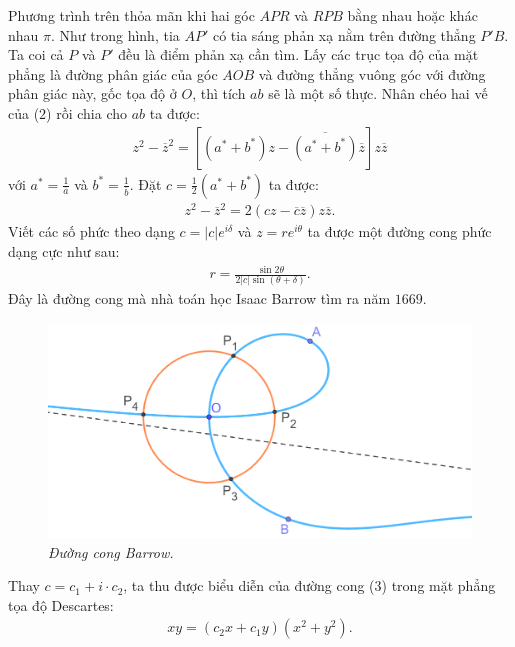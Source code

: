 \begin{multicols}{2}
	\vskip 0.1cm
	Phương trình trên thỏa mãn khi hai góc $APR$ và $RPB$ bằng nhau hoặc khác nhau $\pi$. Như trong hình, tia $AP'$ có tia sáng phản xạ nằm trên đường thẳng $P'B$. Ta coi cả $P$ và $P'$ đều là điểm phản xạ cần tìm.
	\vskip 0.1cm
	Lấy các trục tọa độ của mặt phẳng là đường phân giác của góc $AOB$ và đường thẳng vuông góc với đường phân giác này, gốc tọa độ ở $O$, thì tích $ab$ sẽ là một số thực. Nhân chéo hai vế của ($2$) rồi chia cho $ab$ ta được:
	\begin{align*}
		z^2 - \overline{z}^2 = \left[(a^*+ b^*)z - \overline{(a^*+b^*)}\overline{z}\right]z\overline{z}
	\end{align*}
	với $a^*=\frac{1}{\overline{a}}$ và  $b^*=\frac{1}{\overline{b}}$. Đặt $c = \frac{1}{2}(a^*+ b^*)$ ta được:
	\begin{align*}
		z^2 - \overline{z}^2 = 2 (cz - \overline{c}\overline{z})z\overline{z}.
	\end{align*}
	Viết các số phức theo dạng $c = |c|e^{i\delta}$ và $z=re^{i\theta}$ ta được một đường cong phức dạng cực như sau:
	\begin{align*}
		r = \frac{\sin2\theta}{2|c|\sin(\theta + \delta)}. \tag{$3$}
	\end{align*}
	Đây là đường cong mà nhà toán học Isaac Barrow tìm ra năm $1669$.
	\begin{figure}[H]
		\vspace*{-5pt}
		\centering
		\captionsetup{labelformat= empty, justification=centering}
		\includegraphics[width= 1\linewidth]{14}
		\caption{\small\textit{\color{lichsutoanhoc}Đường cong Barrow.}}
		\vspace*{-10pt}
	\end{figure}
	Thay $c=c_1+i\cdot c_2$, ta thu được biểu diễn của đường cong ($3$) trong mặt phẳng tọa độ Descartes:
	\begin{align*}
		xy = \left(c_2x + c_1y\right)\left(x^2 + y^2\right).

\end{align*}
\end{multicols}
